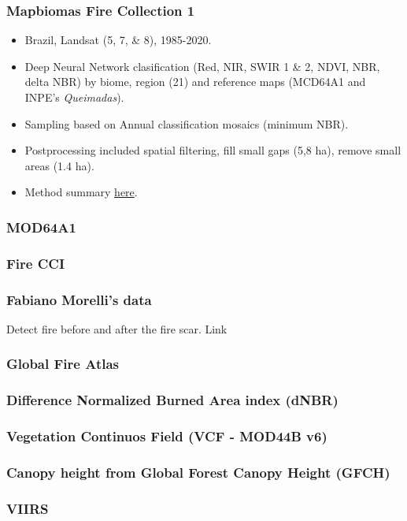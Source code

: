 \documentclass{beamer}
\begin{document}
\begin{frame}
    \frametitle{Mapbiomas Fire Collection 1}
    \begin{itemize}
        \item Brazil, Landsat (5, 7, \& 8), 1985-2020.
        \item Deep Neural Network clasification (Red, NIR, SWIR 1 \& 2, NDVI, 
            NBR, delta NBR) by biome, region (21) and 
            reference maps (MCD64A1 and INPE's \textit{Queimadas}).
        \item Sampling based on Annual classification mosaics (minimum NBR).
        \item Postprocessing included spatial filtering, fill small gaps (5,8 
            ha), remove small areas (1.4 ha).
        \item Method summary 
            \href{https://mapbiomas.org/en/mapbiomas-fire-method}{here}.
    \end{itemize}
\end{frame}

\begin{frame}
    \frametitle{MOD64A1}
\end{frame}

\begin{frame}
    \frametitle{Fire CCI}
\end{frame}

\begin{frame}
    \frametitle{Fabiano Morelli's data}
    Detect fire before and after the fire scar. 
    Link 
\end{frame}

\begin{frame}
    \frametitle{Global Fire Atlas}
\end{frame}

\begin{frame}
    \frametitle{Difference Normalized Burned Area index (dNBR)}
\end{frame}

\begin{frame}
    \frametitle{Vegetation Continuos Field (VCF - MOD44B v6)}
\end{frame}

\begin{frame}
    \frametitle{Canopy height from Global Forest Canopy Height (GFCH)}
\end{frame}

\begin{frame}
    \frametitle{VIIRS}
\end{frame}
\end{document}
